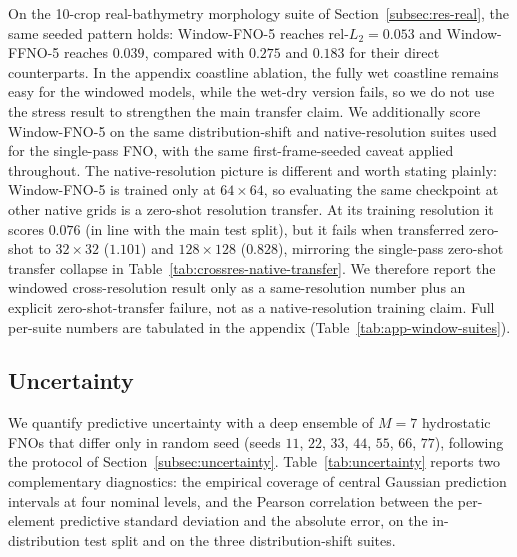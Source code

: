 On the 10-crop real-bathymetry morphology suite of Section~\ref{subsec:res-real}, the same seeded pattern holds: Window-FNO-5 reaches rel-$L_2 = 0.053$ and Window-FFNO-5 reaches $0.039$, compared with $0.275$ and $0.183$ for their direct counterparts. In the appendix coastline ablation, the fully wet coastline remains easy for the windowed models, while the wet-dry version fails, so we do not use the stress result to strengthen the main transfer claim. We additionally score Window-FNO-5 on the same distribution-shift and native-resolution suites used for the single-pass FNO, with the same first-frame-seeded caveat applied throughout. The native-resolution picture is different and worth stating plainly: Window-FNO-5 is trained only at $64 \times 64$, so evaluating the same checkpoint at other native grids is a zero-shot resolution transfer. At its training resolution it scores $0.076$ (in line with the main test split), but it fails when transferred zero-shot to $32 \times 32$ ($1.101$) and $128 \times 128$ ($0.828$), mirroring the single-pass zero-shot transfer collapse in Table~\ref{tab:crossres-native-transfer}. We therefore report the windowed cross-resolution result only as a same-resolution number plus an explicit zero-shot-transfer failure, not as a native-resolution training claim. Full per-suite numbers are tabulated in the appendix (Table~\ref{tab:app-window-suites}).

\subsection{Uncertainty}
\label{subsec:res-uncertainty}
We quantify predictive uncertainty with a deep ensemble of $M = 7$ hydrostatic FNOs that differ only in random seed (seeds $11$, $22$, $33$, $44$, $55$, $66$, $77$), following the protocol of Section~\ref{subsec:uncertainty}. Table~\ref{tab:uncertainty} reports two complementary diagnostics: the empirical coverage of central Gaussian prediction intervals at four nominal levels, and the Pearson correlation between the per-element predictive standard deviation and the absolute error, on the in-distribution test split and on the three distribution-shift suites.

